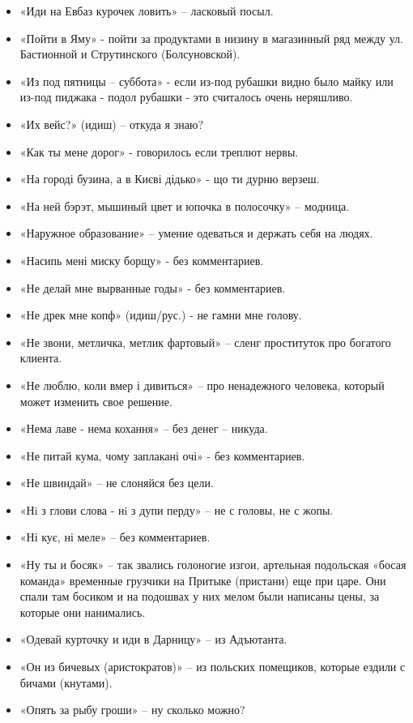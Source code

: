 \begin{itemize}
\item  «Иди на Евбаз курочек ловить» – ласковый посыл.
\item  «Пойти в Яму» - пойти за продуктами в низину в магазинный ряд между ул. Бастионной и Струтинского (Болсуновской). 
\item  «Из под пятницы – суббота» - если из-под рубашки видно было майку или из-под пиджака - подол рубашки - это считалось очень неряшливо.
\item  «Их вейс?» (идиш) – откуда я знаю?
\item  «Как ты мене дорог» - говорилось если треплют  нервы.
\item  «На городі бузина, а в Києві дідько» - що ти дурню верзеш.
\item  «На ней бэрэт, мышиный цвет и юпочка в полосочку» – модница.
\item  «Наружное образование» – умение одеваться и держать себя на людях.
\item  «Насипь мені миску борщу» - без комментариев.
\item  «Не делай мне вырванные годы» - без комментариев. 
\item  «Не дрек мне копф» (идиш/рус.) - не гамни мне голову. 
\item  «Не звони, метличка, метлик фартовый» – сленг проституток про богатого клиента.
\item  «Не люблю, коли вмер і дивиться» – про ненадежного человека, который может изменить  свое решение.
\item  «Нема лаве - нема кохання» – без денег – никуда.
\item  «Не питай кума, чому заплакані очі» - без комментариев.
\item  «Не швиндай» – не слоняйся без цели.
\item  «Нi з глови слова - нi з дупи перду» – не с головы, не с жопы.
\item  «Ні кує, ні меле» – без комментариев.
\item  «Ну ты и босяк» – так звались голоногие изгои, артельная подольская «босая команда» временные грузчики на Притыке (пристани) еще при царе. Они спали там босиком и на подошвах у них мелом были написаны цены, за которые они нанимались.
\item  «Одевай курточку и иди в Дарницу» –  из Адъютанта.
\item  «Он из бичевых (аристократов)» – из польских помещиков, которые ездили с бичами (кнутами). 
\item  «Опять за рыбу гроши» – ну сколько можно?

\end{itemize}
